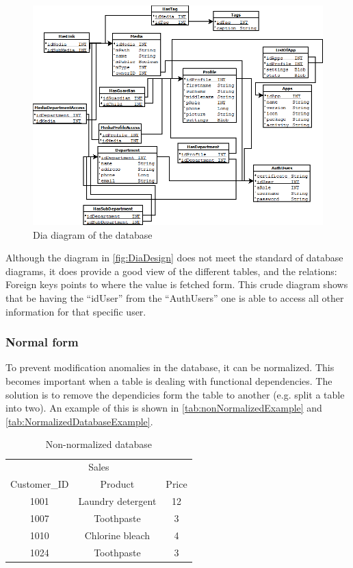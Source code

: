 \begin{figure}[htbp]
	\centering
		\includegraphics[width=1.00\textwidth]{images/DiaDesign.png}
	\caption{Dia diagram of the database}
	\label{fig:DiaDesign}
\end{figure}

Although the diagram in \autoref{fig:DiaDesign} does not meet the standard of database diagrams, it does provide a good view of the different tables, and the relations: Foreign keys points to where the value is fetched form. This crude diagram shows that be having the ``idUser'' from the ``AuthUsers'' one is able to access all other information for that specific user.

\subsubsection{Normal form}
To prevent modification anomalies in the database, it can be normalized. This becomes important when a table is dealing with functional dependencies. The solution is to remove the dependicies form the table to another (e.g. split a table into two). An example of this is shown in \autoref{tab:nonNormalizedExample} and \autoref{tab:NormalizedDatabaseExample}.

\begin{table}[htbp]
	\centering
		\begin{tabular}{|c|c|c|}
		\hline
		 \multicolumn{3}{|c|}{Sales}\\
		\multicolumn{1}{|c}{Customer\_ID} & \multicolumn{1}{c}{Product} & \multicolumn{1}{c|}{Price} \\
		\hline
		1001 & Laundry detergent & 12 \\ \hline
		1007 & Toothpaste & 3 \\ \hline
		1010 & Chlorine bleach & 4 \\ \hline
		1024 & Toothpaste & 3\\	\hline
		\end{tabular}
	\caption{Non-normalized database\cite[p. 114]{sqlForDummies}}
	\label{tab:nonNormalizedExample}
\end{table}

